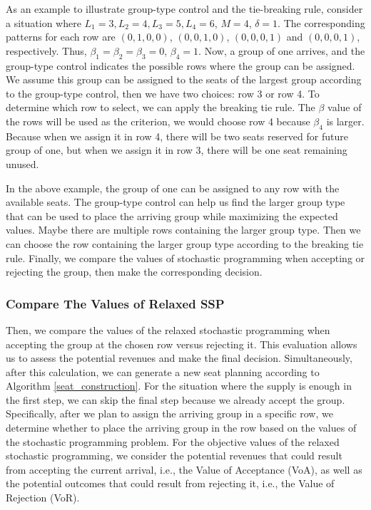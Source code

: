 As an example to illustrate group-type control and the tie-breaking rule, consider a situation where $L_1 =3, L_2 = 4, L_3 =5, L_4 =6$, $M =4$, $\delta =1$. The corresponding patterns for each row are $(0,1,0,0)$, $(0,0,1,0)$, $(0,0,0,1)$ and $(0,0,0,1)$, respectively. Thus, $\beta_1 = \beta_2 = \beta_3 =0$, $\beta_4 =1$. Now, a group of one arrives, and the group-type control indicates the possible rows where the group can be assigned. We assume this group can be assigned to the seats of the largest group according to the group-type control, then we have two choices: row 3 or row 4. To determine which row to select, we can apply the breaking tie rule. The $\beta$ value of the rows will be used as the criterion, we would choose row 4 because $\beta_4$ is larger. Because when we assign it in row 4, there will be two seats reserved for future group of one, but when we assign it in row 3, there will be one seat remaining unused.

In the above example, the group of one can be assigned to any row with the available seats. The group-type control can help us find the larger group type that can be used to place the arriving group while maximizing the expected values. Maybe there are multiple rows containing the larger group type. Then we can choose the row containing the larger group type according to the breaking tie rule. 
Finally, we compare the values of stochastic programming when accepting or rejecting the group, then make the corresponding decision.



\subsubsection*{Compare The Values of Relaxed SSP}
Then, we compare the values of the relaxed stochastic programming when accepting the group at the chosen row versus rejecting it. This evaluation allows us to assess the potential revenues and make the final decision. Simultaneously, after this calculation, we can generate a new seat planning according to Algorithm \ref{seat_construction}. For the situation where the supply is enough in the first step, we can skip the final step because we already accept the group. Specifically, after we plan to assign the arriving group in a specific row, we determine whether to place the arriving group in the row based on the values of the stochastic programming problem. For the objective values of the relaxed stochastic programming, we consider the potential revenues that could result from accepting the current arrival, i.e., the Value of Acceptance (VoA), as well as the potential outcomes that could result from rejecting it, i.e., the Value of Rejection (VoR).

